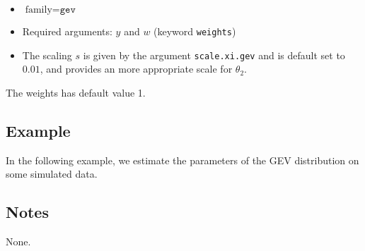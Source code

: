 \documentclass[a4paper,11pt]{article}
\begin{document}
\begin{itemize}
\item $\text{family}=\texttt{gev}$
\item Required arguments: $y$ and $w$ (keyword \texttt{weights})
\item The scaling $s$ is given by the argument \texttt{scale.xi.gev}
    and is default set to $0.01$, and provides an more appropriate
    scale for $\theta_{2}$.
\end{itemize}
The weights has default value 1.

\subsection*{Example}

In the following example, we estimate the parameters of the GEV
distribution on some simulated data.


\subsection*{Notes}

None.
\end{document}
